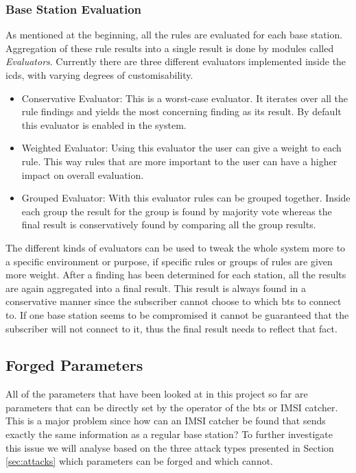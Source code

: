 \subsubsection{Base Station Evaluation}
As mentioned at the beginning, all the rules are evaluated for each base station.
Aggregation of these rule results into a single result is done by modules called \emph{Evaluators}.
Currently there are three different evaluators implemented inside the \gls{icds}, with varying degrees of customisability.
\begin{itemize}
	\item Conservative Evaluator: This is a worst-case evaluator.
	It iterates over all the rule findings and yields the most concerning finding as its result.
	By default this evaluator is enabled in the system.
	\item Weighted Evaluator: Using this evaluator the user can give a weight to each rule.
	This way rules that are more important to the user can have a higher impact on overall evaluation.
	\item Grouped Evaluator: With this evaluator rules can be grouped together.
	Inside each group the result for the group is found by majority vote whereas the final result is conservatively found by comparing all the group results.
\end{itemize}
The different kinds of evaluators can be used to tweak the whole system more to a specific environment or purpose, if specific rules or groups of rules are given more weight.
After a finding has been determined for each station, all the results are again aggregated into a final result.
This result is always found in a conservative manner since the subscriber cannot choose to which \gls{bts} to connect to.
If one base station seems to be compromised it cannot be guaranteed that the subscriber will not connect to it, thus the final result needs to reflect that fact.

\subsection{Forged Parameters}
\label{sec:fake_parameters}
All of the parameters that have been looked at in this project so far are parameters that can be directly set by the operator of the \gls{bts} or IMSI catcher.
This is a major problem since how can an IMSI catcher be found that sends exactly the same information as a regular base station?
To further investigate this issue we will analyse based on the three attack types presented in Section \ref{sec:attacks} which parameters can be forged and which cannot.

